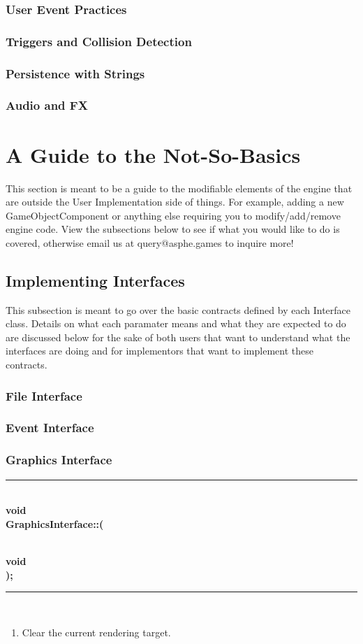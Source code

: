 \documentclass[12pt]{article}
\newcommand{\param}[1]{\indent\phantom{indent} \textbf{#1}\\ }
\newenvironment{func}[3]%
{%
	\noindent\ignorespaces
	\rule{\textwidth} {1pt} \\
	\textbf{#1\\#2::{\Large \color{blue}{#3}}(} \\ \\
	\noindent\ignorespaces
}%
{%
	\textbf{);} \\
	\ignorespacesafterend
	\rule{\textwidth} {0.01pt} \\
}
\begin{document}
\subsubsection{User Event Practices}
\subsubsection{Triggers and Collision Detection}
\subsubsection{Persistence with Strings}
\subsubsection{Audio and FX}

\section{A Guide to the Not-So-Basics}
This section is meant to be a guide to the modifiable elements of the engine that are outside the User Implementation side of things. For example, adding a new GameObjectComponent or anything else requiring you to modify/add/remove engine code. View the subsections below to see if what you would like to do is covered, otherwise email us at query@asphe.games to inquire more!
\subsection{Implementing Interfaces}
This subsection is meant to go over the basic contracts defined by each Interface class. Details on what each paramater means and what they are expected to do are discussed below for the sake of both users that want to understand what the interfaces are doing and for implementors that want to implement these contracts.
\subsubsection{File Interface}
\subsubsection{Event Interface}
\subsubsection{Graphics Interface}

\begin{func}{void}{GraphicsInterface}{renderClear}
\param{void}
\end{func}
\begin{enumerate}
\item Clear the current rendering target.
\end{enumerate}
\end{document}
